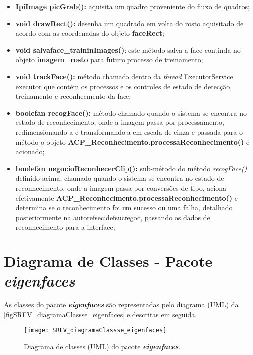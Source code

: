 \begin{itemize}
\begin{itemize}
		\item \textbf{IpiImage picGrab():} aquisita um quadro proveniente do fluxo de quadros;
		
		\item \textbf{void drawRect():} desenha um quadrado em volta do rosto aquisitado de acordo com as coordenadas do objeto \textbf{faceRect};
		
		\item \textbf{void salvaface\_traininImages()}: este método salva a face continda no objeto \textbf{imagem\_rosto} para futuro processo de treinamento;
		
		\item \textbf{void trackFace():} método chamado dentro da \textit{thread} ExecutorService executor que contém os processos e os controles de estado de detecção, treinamento e reconhecmento da face;
		
		\item \textbf{boolefan recogFace():} método chamado quando o sistema se encontra no estado de reconhecimento, onde a imagem passa por processamento, redimensionando-a e transformando-a em escala de cinza e passada para o método o objeto \textbf{ACP\_Reconhecimento.processaReconhecimento()} é acionado;
		
		\item \textbf{boolefan negocioReconhecerClip():} sub-método do método \textit{recogFace()} definido acima, chamado quando o sistema se encontra no estado de reconhecimento, onde a imagem passa por conversões de tipo,  aciona efetivamente \textbf{ACP\_Reconhecimento.processaReconhecimento()} e determina se o reconhecimento foi um sucesso ou uma falha, detalhado posteriormente na autoref{sec:defsucregoc}, passando os dados de reconhecimento para a interface;
	\end{itemize}
\end{itemize}

\section{Diagrama de Classes - Pacote \textit{\textbf{eigenfaces}}}\label{sec:eigenfacesclass}
As classes do pacote \textbf{\textit{eigenfaces}} são representadas pelo diagrama (UML) da \autoref{figSRFV_diagramaClassse_eigenfaces} e descritas em seguida. 

\begin{figure}[h]
	\centering
	\texttt{[image: SRFV\_diagramaClassse\_eigenfaces]}
	\caption{Diagrama de classes (UML) do pacote \textbf{\textit{eigenfaces}}.}
	\label{figSRFV_diagramaClassse_eigenfaces}
\end{figure}

